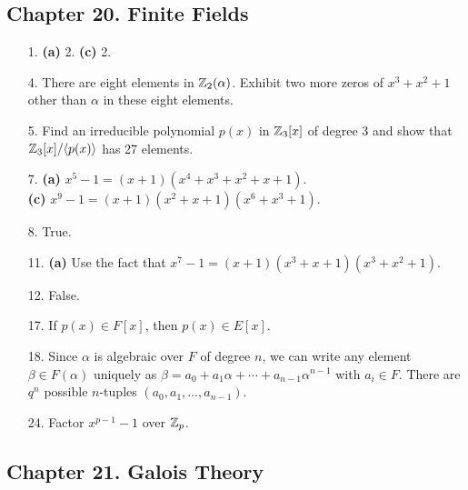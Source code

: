 \subsection*{Chapter 20. Finite Fields}
 
{\small
\begin{itemize}

\bf\item[1.]\rm
{\bf (a)} 2.
{\bf (c)} 2.
 
\bf\item[4.]\rm 
There are eight elements in ${\Bbb Z}_2(\alpha)$. Exhibit two more
zeros of $x^3 + x^2 + 1$ other than $\alpha$ in these eight elements. 
 
\bf\item[5.]\rm 
Find an irreducible polynomial $p(x)$ in ${\Bbb Z}_3[x]$ of degree
3 and show that ${\Bbb Z}_3[x]/ \langle p(x) \rangle$ has 27
elements. 

\bf\item[7.]\rm
{\bf (a)} $x^5 -1 = (x+1)(x^4+x^3 + x^2 + x+ 1)$. \\
{\bf (c)} $x^9 -1 = (x+1)( x^2 + x+ 1)(x^6+x^3+1)$.
 
\bf\item[8.]\rm
True.

\bf\item[11.]\rm
{\bf (a)} Use the fact that $x^7 -1 = (x+1)( x^3 + x+ 1)(x^3+x^2+1)$.

\bf\item[12.]\rm
False.

\bf\item[17.]\rm
If $p(x) \in F[x]$, then $p(x) \in E[x]$.


\bf\item[18.]\rm
Since $\alpha$ is algebraic over $F$ of degree $n$, we can write any
element $\beta \in F(\alpha)$ uniquely as $\beta = a_0  + a_1 \alpha +
\cdots + a_{n-1} \alpha^{n-1}$ with $a_i \in F$. There are $q^n$
possible $n$-tuples $(a_0, a_1, \ldots, a_{n-1})$.


\bf\item[24.]\rm
Factor $x^{p-1} - 1$ over ${\Bbb Z}_p$.


\end{itemize}
}
 
\subsection*{Chapter 21. Galois Theory}
 
